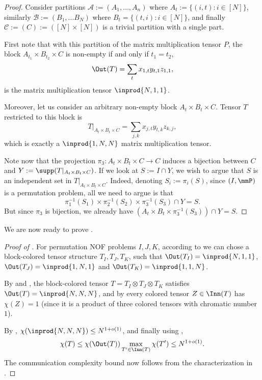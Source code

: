\begin{proof}
    Consider partitions $\mathcal{A} := (A_1, \ldots, A_n)$ where $A_t := \{ (i, t) : i \in [N] \}$, similarly $\mathcal{B} := (B_1, \ldots B_N)$ where $B_t = \{ (t, i) : i \in [N] \}$, and finally $\mathcal{C} := (C) := ([N] \times [N])$ is a trivial partition with a single part.

    First note that with this partition of the matrix multiplication tensor $P$, the block $A_{t_1} \times B_{t_2} \times C$ is non-empty if and only if $t_1 = t_2$,
    \begin{equation*}
        \Out(T) = \sum_{t} x_{1,t} y_{t, 1} z_{1,1},
    \end{equation*}
    is the matrix multiplication tensor $\inprod{N,1,1}$.

    Moreover, let us consider an arbitrary non-empty block $A_t \times B_t \times C$. Tensor $T$ restricted to this block is
    \begin{equation*}
        T|_{A_t \times B_t \times C} = \sum_{j,k} x_{j,t} y_{t, k} z_{k,j},
    \end{equation*}
    which is exactly a $\inprod{1,N,N}$ matrix multiplication tensor.

    Note now that the projection $\pi_3 : A_t \times B_t \times C \to C$ induces a bijection between $C$ and $Y := \supp(T|_{A_t \times B_t \times C})$. If we look at $S := I \cap Y$, we wish to argue that $S$ is an independent set in $T|_{A_t \times B_t \times C}$. Indeed, denoting $S_i := \pi_i(S)$, since $(I, \mmP)$ is a permutation problem, all we need to argue is that 
    \begin{equation*}
        \pi_1^{-1}(S_1) \times \pi_2^{-1}(S_2) \times \pi_3^{-1}(S_3) \cap Y = S.
    \end{equation*}
    But since $\pi_3$ is bijection, we already have $(A_t \times B_t \times \pi_3^{-1}(S_3)) \cap Y = S$.
\end{proof}

We are now ready to prove .
\begin{proof}[Proof of ]
For permutation NOF problems $I, J, K$, according to  we can chose a block-colored tensor structure $T_I, T_J, T_K$, such that $\Out(T_I) = \inprod{N,1,1}$, $\Out(T_J) = \inprod{1,N,1}$ and $\Out(T_K) = \inprod{1,1,N}$.

By  and , the block-colored tensor $T = T_I \otimes T_J \otimes T_K$ satisfies $\Out(T) = \inprod{N,N,N}$, and by  every colored tensor $Z \in \Inn(T)$ has $\chi(Z) = 1$ (since it is a product of three colored tensors with chromatic number $1$).

By , $\chi(\inprod{N,N,N}) \leq N^{1 + o(1)}$, and finally using , 
\begin{equation*}
    \chi(T) \leq \chi(\Out(T)) \max_{T' \in \Inn(T)} \chi(T') \leq N^{1+o(1)}.
\end{equation*}
The communication complexity bound now follows from the characterization in .
\end{proof}

